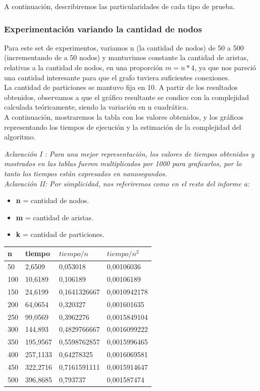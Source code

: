 \noindent A continuación, describiremos las particularidades de cada tipo de prueba.

\subsubsection{Experimentación variando la cantidad de nodos}

Para este set de experimentos, variamos n (la cantidad de nodos) de 50 a 500 (incrementando de a 50 nodos) y mantuvimos constante la cantidad de aristas, relativas a la cantidad de nodos, en una proporción $m = n*4$, ya que nos pareció una cantidad interesante para que el grafo tuviera suficientes conexiones.\\ La cantidad de particiones se mantuvo fija en 10.
A partir de los resultados obtenidos, observamos a que el gráfico resultante se condice con la complejidad calculada teóricamente, siendo la variación en n cuadrática.\\
A continuación, mostraremos la tabla con los valores obtenidos, y los gráficos representando los tiempos de ejecución y la estimación de la complejidad del algoritmo.

\noindent \textit{Aclaración I : Para una mejor representación, los valores de tiempos obtenidos y mostrados en las tablas fueron multiplicados por 1000 para graficarlos, por lo tanto los tiempos están expresados en nanosegundos.}\\

\noindent \textit{Aclaración II: Por simplicidad, nos referiremos como en el resto del informe a:}\\

\noindent \begin{itemize}
\item \textbf{n} = cantidad de nodos.
\item \textbf{m} = cantidad de aristas.
\item \textbf{k} = cantidad de particiones.
\end{itemize}

\begin{center}
	\begin{tabular}{| l | l | l | l |}
	\hline
	n & tiempo & $tiempo/n$ & $tiempo/n^2$\\ \hline
	50 & 2,6509 & 0,053018 & 0,00106036\\
	100 & 10,6189 & 0,106189 & 0,00106189\\
	150 & 24,6199 & 0,1641326667 & 0,0010942178\\
	200	& 64,0654 & 0,320327 & 0,001601635\\
	250 & 99,0569 & 0,3962276 & 0,0015849104\\
	300 & 144,893 & 0,4829766667 & 0,0016099222\\
	350 & 195,9567 & 0,5598762857 & 0,0015996465\\
	400 & 257,1133 & 0,64278325 & 0,0016069581\\
	450 & 322,2716 & 0,7161591111 & 0,0015914647\\
	500	& 396,8685 & 0,793737 & 0,001587474\\
	\hline
	\end{tabular}
\end{center}

